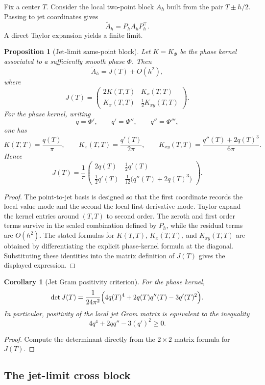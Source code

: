 \documentclass[11pt]{article}
\theoremstyle{plain}
\newtheorem{proposition}[theorem]{Proposition}
\newtheorem{corollary}[theorem]{Corollary}
\theoremstyle{definition}
\newcommand{\wt}{\widetilde}
\begin{document}
Fix a center $T$. Consider the local two-point block $A_h$ built from the pair $T\pm h/2$. Passing to jet coordinates gives
\[
\wt A_h=P_hA_hP_h^\top.
\]
A direct Taylor expansion yields a finite limit.

\begin{proposition}[Jet-limit same-point block]
Let $K=K_\Phi$ be the phase kernel associated to a sufficiently smooth phase $\Phi$. Then
\[
\wt A_h = J(T)+O(h^2),
\]
where
\[
J(T)=
\begin{pmatrix}
2K(T,T) & K_x(T,T)\\[1ex]
K_x(T,T) & \frac12 K_{xy}(T,T)
\end{pmatrix}.
\]
For the phase kernel, writing
\[
q=\Phi',\qquad q'=\Phi'',\qquad q''=\Phi''',
\]
one has
\[
K(T,T)=\frac{q(T)}{\pi},\qquad K_x(T,T)=\frac{q'(T)}{2\pi},\qquad K_{xy}(T,T)=\frac{q''(T)+2q(T)^3}{6\pi}.
\]
Hence
\[
J(T)=\frac1\pi
\begin{pmatrix}
2q(T) & \frac12 q'(T)\\[1ex]
\frac12 q'(T) & \frac1{12}\bigl(q''(T)+2q(T)^3\bigr)
\end{pmatrix}.
\]
\end{proposition}

\begin{proof}
The point-to-jet basis is designed so that the first coordinate records the local value mode and the second the local first-derivative mode. Taylor-expand the kernel entries around $(T,T)$ to second order. The zeroth and first order terms survive in the scaled combination defined by $P_h$, while the residual terms are $O(h^2)$. The stated formulas for $K(T,T)$, $K_x(T,T)$, and $K_{xy}(T,T)$ are obtained by differentiating the explicit phase-kernel formula at the diagonal. Substituting these identities into the matrix definition of $J(T)$ gives the displayed expression.
\end{proof}

\begin{corollary}[Jet Gram positivity criterion]
For the phase kernel,
\[
\det J(T)=\frac{1}{24\pi^2}\Bigl(4q(T)^4+2q(T)q''(T)-3q'(T)^2\Bigr).
\]
In particular, positivity of the local jet Gram matrix is equivalent to the inequality
\[
4q^4+2qq''-3(q')^2\ge 0.
\]
\end{corollary}

\begin{proof}
Compute the determinant directly from the $2\times2$ matrix formula for $J(T)$.
\end{proof}

\subsection{The jet-limit cross block}
\end{document}
